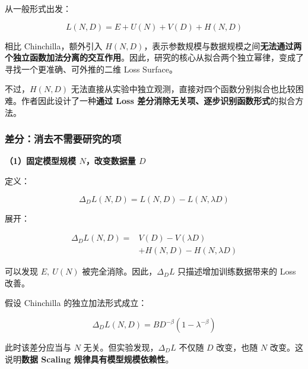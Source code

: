 \documentclass[
  11pt,
  a4paper,
  fontset=none]{ctexart}
\newenvironment{NotesFormula}{%
  \par\noindent\begin{minipage}{\linewidth}%
  \setlength{\parindent}{2em}%
  \setlength{\parskip}{0.35em}%
}{\end{minipage}\par}
\begin{document}
\begin{NotesFormula}

从一般形式出发：

\[\boxed{L(N,D)=E+U(N)+V(D)+H(N,D)}\]

\end{NotesFormula}

相比 Chinchilla，额外引入
\(H(N,D)\)，表示参数规模与数据规模之间\textbf{无法通过两个独立函数加法分离的交互作用}。因此，研究的核心从拟合两个独立幂律，变成了寻找一个更准确、可外推的二维
Loss Surface。

不过，\(H(N,D)\)
无法直接从实验中独立观测，直接对四个函数分别拟合也比较困难。作者因此设计了一种\textbf{通过
Loss 差分消除无关项、逐步识别函数形式}的拟合方法。

\subsubsection{差分：消去不需要研究的项}\label{ux5deeux5206ux6d88ux53bbux4e0dux9700ux8981ux7814ux7a76ux7684ux9879}

\textbf{（1）固定模型规模 \(N\)，改变数据量 \(D\)}

\begin{NotesFormula}

定义：

\[\Delta_DL(N,D)=L(N,D)-L(N,\lambda D)\]

\end{NotesFormula}

\begin{NotesFormula}

展开：

\[\begin{aligned}
\Delta_DL(N,D)={}&V(D)-V(\lambda D)\\
&+H(N,D)-H(N,\lambda D)
\end{aligned}\]

\end{NotesFormula}

可以发现 \(E,\ U(N)\) 被完全消除。因此，\(\Delta_DL\)
只描述增加训练数据带来的 Loss 改善。

\begin{NotesFormula}

假设 Chinchilla 的独立加法形式成立：

\[\Delta_DL(N,D)=BD^{-\beta}(1-\lambda^{-\beta})\]

\end{NotesFormula}

此时该差分应当与 \(N\) 无关。但实验发现，\(\Delta_DL\) 不仅随 \(D\)
改变，也随 \(N\) 改变。这说明\textbf{数据 Scaling
规律具有模型规模依赖性}。
\end{document}

